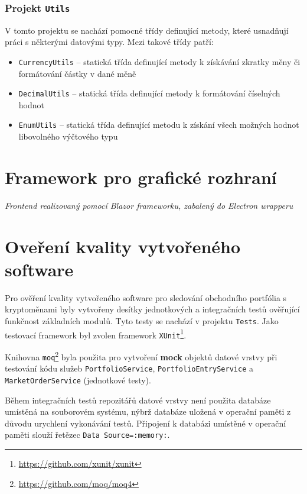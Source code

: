 \documentclass[12pt, a4paper]{article}
\begin{document}
    \subsubsection{Projekt \texttt{Utils}}
    V tomto projektu se nachází pomocné třídy definující metody, které usnadňují práci s některými datovými typy. 
    Mezi takové třídy patří:

    \begin{itemize}
        \item \texttt{CurrencyUtils} -- statická třída definující metody k získávání zkratky měny či formátování částky v dané měně
        \item \texttt{DecimalUtils} -- statická třída definující metody k formátování číselných hodnot
        \item \texttt{EnumUtils} -- statická třída definující metodu k získání všech možných hodnot libovolného výčtového typu
    \end{itemize}
    
    \section{Framework pro grafické rozhraní}
    \textit{Frontend realizovaný pomocí Blazor frameworku, zabalený do Electron wrapperu}


    \section{Oveření kvality vytvořeného software}

    Pro ověření kvality vytvořeného software pro sledování obchodního portfólia s kryptoměnami byly vytvořeny desítky jednotkových a integračních testů ověřující funkčnost základních modulů. Tyto testy se nachází v projektu \texttt{Tests}. Jako testovací framework byl zvolen framework \texttt{XUnit}\footnote{\url{https://github.com/xunit/xunit}}.

    Knihovna \texttt{moq}\footnote{\url{https://github.com/moq/moq4}} byla použita pro vytvoření \textbf{mock} objektů datové vrstvy při testování kódu služeb \texttt{PortfolioService}, \texttt{PortfolioEntryService} a \texttt{MarketOrderService} (jednotkové testy).

    Během integračních testů repozitářů datové vrstvy není použita databáze umístěná na souborovém systému, nýbrž databáze uložená v operační paměti z důvodu urychlení vykonávání testů. Připojení k databázi umístěné v operační paměti slouží řetězec \texttt{Data Source=:memory:}.
\end{document}
